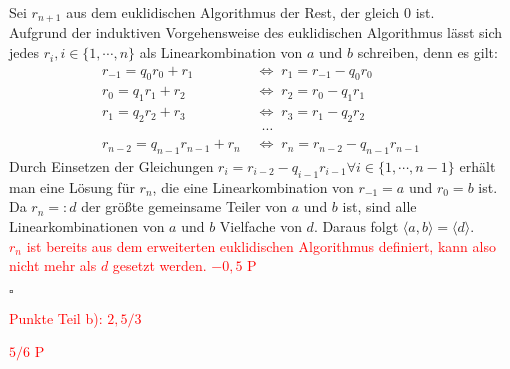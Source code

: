 \documentclass[12pt]{article}
\newcommand{\corr}[1]{\textcolor{red}{#1}}
\newcommand{\QED}{\begin{flushright} $\square$ \end{flushright}}
\newcommand{\ideal}[1]{\langle#1\rangle}
\newcommand{\gdw}{\;\Longleftrightarrow\;}
\begin{document}
\begin{enumerate}
	Sei $r_{n+1}$ aus dem euklidischen Algorithmus der Rest, der gleich $0$ ist. \\
	Aufgrund der induktiven Vorgehensweise des euklidischen Algorithmus lässt sich jedes $r_i, i\in\{1,\cdots,n\}$ als Linearkombination von $a$ und $b$ schreiben, denn es gilt:
	\begin{align*}
		r_{-1}=q_{0}r_{0}+r_{1} &\gdw r_{1}=r_{-1}-q_{0}r_{0} \\
		r_{0}=q_{1}r_{1}+r_{2} &\gdw r_{2}=r_{0}-q_{1}r_{1} \\
		r_{1}=q_{2}r_{2}+r_{3} &\gdw r_{3}=r_{1}-q_{2}r_{2} \\
		&\;\;\,\cdots  \\
		r_{n-2}=q_{n-1}r_{n-1}+r_{n} &\gdw r_{n}=r_{n-2}-q_{n-1}r_{n-1}
	\end{align*}
	Durch Einsetzen der Gleichungen $r_i=r_{i-2}-q_{i-1}r_{i-1}\forall i\in\{1,\cdots,n-1\}$ erhält man eine Lösung für $r_n$, die eine Linearkombination von $r_{-1}=a$ und $r_0=b$ ist. \\
	Da $r_n=:d$ der größte gemeinsame Teiler von $a$ und $b$ ist, sind alle Linearkombinationen von $a$ und $b$ Vielfache von $d$. Daraus folgt $\ideal{a,b}=\ideal{d}$.\\
\corr{$r_n$ ist bereits aus dem erweiterten euklidischen Algorithmus definiert, kann also nicht mehr als $d$ gesetzt werden. $-0,5$ P}
	\QED
\corr{Punkte Teil b): $2,5/3$}
	
\end{enumerate}
\corr{$5/6$ P}
\end{document}
